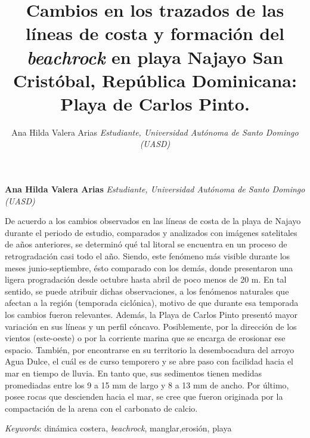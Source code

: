 \documentclass[11pt,]{article}
\title{Cambios en los trazados de las líneas de costa y formación del
\emph{beachrock} en playa Najayo San Cristóbal, República Dominicana:
Playa de Carlos Pinto.  }
\author{\Large Ana Hilda Valera Arias\vspace{0.05in} \newline\normalsize\emph{Estudiante, Universidad Autónoma de Santo Domingo (UASD)}  }
\date{}
\newcommand*{\authorfont}{\fontfamily{phv}\selectfont}
\renewenvironment{abstract}
 {{%
    \setlength{\leftmargin}{0mm}
    \setlength{\rightmargin}{\leftmargin}%
  }%
  \relax}
 {\endlist}
\begin{document}
	
%

{%
\setlength{\parindent}{0pt}
\thispagestyle{plain}
{\fontsize{18}{20}\selectfont\raggedright 
\maketitle  %

}

{
   \vskip 13.5pt\relax \normalsize\fontsize{11}{12} 
\textbf{\authorfont Ana Hilda Valera Arias} \hskip 15pt \emph{\small Estudiante, Universidad Autónoma de Santo Domingo (UASD)}   

}

}








\begin{abstract}

    \hbox{\vrule height .2pt width 39.14pc}

    \vskip 8.5pt %

\noindent De acuerdo a los cambios observados en las líneas de costa de la playa
de Najayo durante el periodo de estudio, comparados y analizados con
imágenes satelitales de años anteriores, se determinó qué tal litoral se
encuentra en un proceso de retrogradación casi todo el año. Siendo, este
fenómeno más visible durante los meses junio-septiembre, ésto comparado
con los demás, donde presentaron una ligera progradación desde octubre
hasta abril de poco menos de 20 m. En tal sentido, se puede atribuir
dichas observaciones, a los fenómenos naturales que afectan a la región
(temporada ciclónica), motivo de que durante esa temporada los cambios
fueron relevantes. Además, la Playa de Carlos Pinto presentó mayor
variación en sus líneas y un perfil cóncavo. Posiblemente, por la
dirección de los vientos (este-oeste) o por la corriente marina que se
encarga de erosionar ese espacio. También, por encontrarse en su
territorio la desembocadura del arroyo Agua Dulce, el cuál es de curso
temporero y se abre paso con facilidad hacia el mar en tiempo de lluvia.
En tanto que, sus sedimentos tienen medidas promediadas entre los 9 a 15
mm de largo y 8 a 13 mm de ancho. Por último, posee rocas que descienden
hacia el mar, se cree que fueron originada por la compactación de la
arena con el carbonato de calcio.


\vskip 8.5pt \noindent \emph{Keywords}: dinámica costera, \emph{beachrock}, manglar,erosión, playa \par

    \hbox{\vrule height .2pt width 39.14pc}



\end{abstract}
\end{document}

